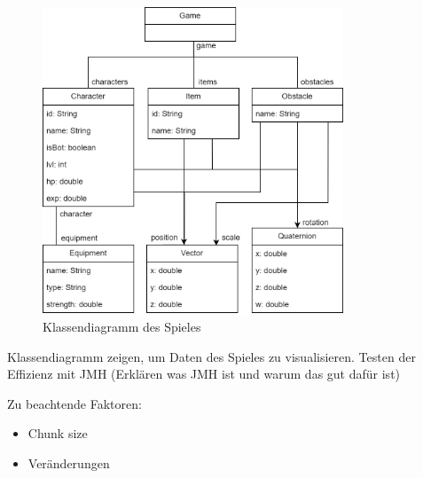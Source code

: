\begin{figure}[htp]
    \centering
    \includegraphics[width=0.8\textwidth]{images/Klassendiagramm.png}
    \caption{Klassendiagramm des Spieles}
    \label{fig:classDia}
\end{figure}

Klassendiagramm zeigen, um Daten des Spieles zu visualisieren. Testen der Effizienz mit JMH (Erklären was JMH ist und warum das gut dafür ist)

Zu beachtende Faktoren:
\begin{itemize}
    \item Chunk size
    \item Veränderungen
\end{itemize}